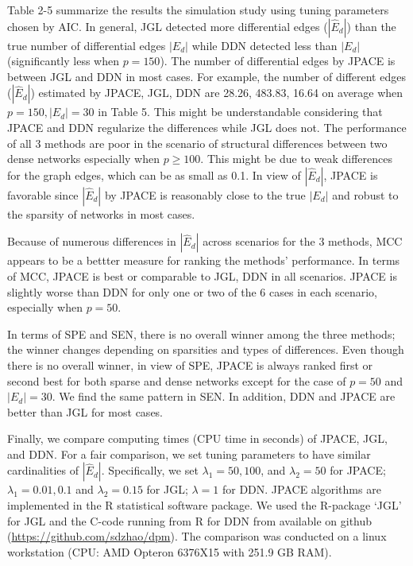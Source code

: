 \documentclass[useAMS,usenatbib,referee]{bio}
\begin{document}
{Table 2-5 summarize the results the simulation study using tuning parameters chosen by AIC.  In general, JGL detected more differential edges ($|\hat{E}_d|$) than the true number of differential edges $|E_d|$ while DDN detected less than $|E_d|$ (significantly less when $p=150$). 
The number of differential edges by JPACE is between JGL and DDN in most cases. For example, the number of different edges ($|\hat{E}_d|$) estimated by JPACE, JGL, DDN are 28.26, 483.83, 16.64 on average when $p=150, |E_d|=30$ in Table 5. This might be understandable considering that JPACE and DDN regularize the differences while JGL does not. The performance of all 3 methods are poor in the scenario of structural differences between two dense networks especially when $p \ge 100$. This might be due to weak differences for the graph edges, which can be as small as 0.1. In view of $|\hat{E}_d|$, JPACE is favorable since $|\hat{E}_d|$ by JPACE is reasonably close to the true $|E_d|$ and robust to the sparsity of networks in most cases.

Because of numerous differences in $|\hat{E}_d|$ across scenarios for the 3 methods, MCC appears to be a bettter measure for ranking the methods' performance. In terms of MCC, JPACE is best or comparable to JGL, DDN in all scenarios. JPACE is slightly worse than DDN for only one or two of the 6 cases in each scenario, especially when $p=50$. 

In terms of SPE and SEN, there is no overall winner among the three methods; the winner changes depending on sparsities and types of differences. Even though there is no overall winner, in view of SPE, JPACE is always ranked first or second best for both sparse and dense networks except for the case of $p=50$ and $|E_d| = 30$.  We find the same pattern in SEN. In addition, DDN and JPACE are better than JGL for most cases.
 
Finally, we compare computing times (CPU time in seconds) of JPACE, JGL, and DDN. For a fair comparison, we set tuning parameters to have similar cardinalities of $|\hat{E}_d|$. Specifically, we set $\lambda_1 = 50, 100$, and $\lambda_2 = 50$ for JPACE; $\lambda_1 = 0.01, 0.1$ and  $\lambda_2 = 0.15$ for JGL; $\lambda = 1$ for DDN. JPACE algorithms are implemented in the R statistical software package. We used the R-package `JGL' for JGL and the C-code running from R for DDN from \citet{Zhao:2014} available on github (\url{https://github.com/sdzhao/dpm}). The comparison was conducted on a linux workstation (CPU: AMD Opteron 6376X15 with 251.9 GB RAM). 

}
\end{document}

